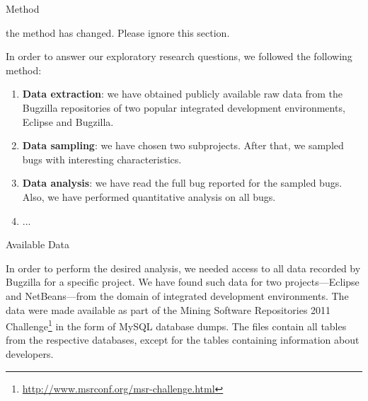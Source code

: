 \begin{section}{Method}


  \TODO the method has changed. Please ignore this section.

In order to answer our exploratory research questions, we followed the following method:

\begin{enumerate}
	\item \textbf{Data extraction}: we have obtained publicly available raw data from the Bugzilla repositories of two popular integrated development environments, Eclipse and Bugzilla.
	
	\item \textbf{Data sampling}: we have chosen two subprojects. After that, we sampled bugs with interesting characteristics.
	
	\item \textbf{Data analysis}: we have read the full bug reported for the sampled bugs. Also, we have performed quantitative analysis on all bugs.
	
	\item ...
\end{enumerate}

\begin{subsection}{Available Data}
	
	In order to perform the desired analysis, we needed access to all data recorded by Bugzilla for a specific project. We have found such data for two projects---Eclipse and NetBeans---from the domain of integrated development environments. The data were made available as part of the Mining Software Repositories 2011 Challenge\footnote{\url{http://www.msrconf.org/msr-challenge.html}} in the form of MySQL database dumps. The files contain all tables from the respective databases, except for the tables containing information about developers.
	


\end{subsection}
\end{section}
